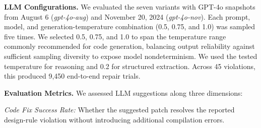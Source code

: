 \textbf{LLM Configurations.}
We evaluated the seven variants with GPT-4o snapshots from August 6
(\textit{gpt-4o-aug}) and November 20, 2024
(\textit{gpt-4o-nov}). Each prompt, model, and generation-temperature
combination (0.5, 0.75, and 1.0) was sampled five times. We selected 0.5, 0.75, and 1.0 to span the temperature range commonly recommended for code generation, balancing output reliability against sufficient sampling diversity to expose model nondeterminism. We used the 
tested temperature for reasoning and 0.2 for structured extraction.
Across 45 violations, this produced 9,450 end-to-end repair
trials.

\textbf{Evaluation Metrics.} We assessed LLM suggestions along three dimensions:

\textit{Code Fix Success Rate:} Whether the suggested patch resolves
the reported design-rule violation without introducing additional
compilation errors.

